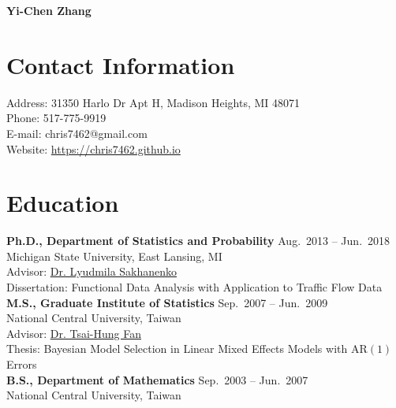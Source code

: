 \documentclass[a4paper,10pt,dvipdfmx]{article}
\begin{document}
\begin{center}
  {\huge \textbf{Yi-Chen Zhang}}
\end{center}

\section*{Contact Information}
\indent Address: 31350 Harlo Dr Apt H, Madison Heights, MI 48071\\
\indent Phone: 517-775-9919\\
\indent E-mail: chris7462@gmail.com\\
\indent Website: \href{https://chris7462.github.io}{https://chris7462.github.io}

\section*{Education}
\indent \textbf{Ph.D., Department of Statistics and Probability} \hfill Aug.~2013 -- Jun.~2018\\
\indent Michigan State University, East Lansing, MI\\
\indent Advisor: \href{https://www.stt.msu.edu/users/luda/}{Dr. Lyudmila Sakhanenko}\\
\indent Dissertation: Functional Data Analysis with Application to Traffic Flow Data\\

\indent \textbf{M.S., Graduate Institute of Statistics} \hfill Sep.~2007 -- Jun.~2009\\
\indent National Central University, Taiwan\\
\indent Advisor: \href{http://www.stat.ncu.edu.tw/teacher/THFan/index.htm}{Dr. Tsai-Hung Fan}\\
\indent Thesis: Bayesian Model Selection in Linear Mixed Effects Models with AR$(1)$ Errors\\

\indent \textbf{B.S., Department of Mathematics} \hfill Sep.~2003 -- Jun.~2007\\
\indent National Central University, Taiwan
\end{document}
